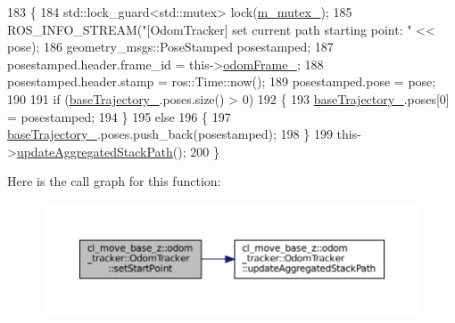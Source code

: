 \begin{DoxyCode}
183 \{
184   std::lock\_guard<std::mutex> lock(\hyperlink{classcl__move__base__z_1_1odom__tracker_1_1OdomTracker_aa371639e1eee269273dec8d3ab9dba0f}{m\_mutex\_});
185   ROS\_INFO\_STREAM(\textcolor{stringliteral}{"[OdomTracker] set current path starting point: "} << pose);
186   geometry\_msgs::PoseStamped posestamped;
187   posestamped.header.frame\_id = this->\hyperlink{classcl__move__base__z_1_1odom__tracker_1_1OdomTracker_a54f31af5e74006560d94f266297853d4}{odomFrame\_};
188   posestamped.header.stamp = ros::Time::now();
189   posestamped.pose = pose;
190 
191   \textcolor{keywordflow}{if} (\hyperlink{classcl__move__base__z_1_1odom__tracker_1_1OdomTracker_a466d18a86df049f0f680e043bb5ea91f}{baseTrajectory\_}.poses.size() > 0)
192   \{
193     \hyperlink{classcl__move__base__z_1_1odom__tracker_1_1OdomTracker_a466d18a86df049f0f680e043bb5ea91f}{baseTrajectory\_}.poses[0] = posestamped;
194   \}
195   \textcolor{keywordflow}{else}
196   \{
197     \hyperlink{classcl__move__base__z_1_1odom__tracker_1_1OdomTracker_a466d18a86df049f0f680e043bb5ea91f}{baseTrajectory\_}.poses.push\_back(posestamped);
198   \}
199   this->\hyperlink{classcl__move__base__z_1_1odom__tracker_1_1OdomTracker_a7922f1e1e688a2ed62d32d9914985a9f}{updateAggregatedStackPath}();
200 \}
\end{DoxyCode}
Here is the call graph for this function\+:
\nopagebreak
\begin{figure}[H]
\begin{center}
\leavevmode
\includegraphics[width=350pt]{classcl__move__base__z_1_1odom__tracker_1_1OdomTracker_a4aefe72c155bd0d57c9f42b77a8928a6_cgraph}
\end{center}
\end{figure}
\mbox{\label{classcl__move__base__z_1_1odom__tracker_1_1OdomTracker_aeed01bdefd9a1cc709b0b3e4eed285ed}} 
